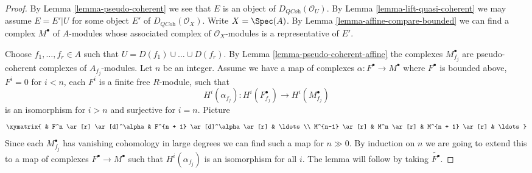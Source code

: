 \begin{proof}
By Lemma \ref{lemma-pseudo-coherent} we see that $E$ is an object of
$D_{\textit{QCoh}}(\mathcal{O}_U)$. By
Lemma \ref{lemma-lift-quasi-coherent}
we may assume $E = E'|U$ for some object $E'$ of
$D_{\textit{QCoh}}(\mathcal{O}_X)$.
Write $X = \Spec(A)$. By Lemma \ref{lemma-affine-compare-bounded}
we can find a complex $M^\bullet$ of $A$-modules whose associated
complex of $\mathcal{O}_X$-modules is a representative of $E'$.

\medskip\noindent
Choose $f_1, \ldots, f_r \in A$ such that $U = D(f_1) \cup \ldots \cup D(f_r)$.
By Lemma \ref{lemma-pseudo-coherent-affine} the complexes
$M^\bullet_{f_j}$ are pseudo-coherent complexes of $A_{f_j}$-modules.
Let $n$ be an integer. Assume we have a map of complexes
$\alpha : F^\bullet \to M^\bullet$ where $F^\bullet$ is
bounded above, $F^i = 0$ for $i < n$, each $F^i$ is a finite free
$R$-module, such that
$$
H^i(\alpha_{f_j}) : H^i(F^\bullet_{f_j}) \to H^i(M^\bullet_{f_j})
$$
is an isomorphism for $i > n$ and surjective for $i = n$. Picture
$$
\xymatrix{
& F^n \ar[r] \ar[d]^\alpha & F^{n + 1} \ar[d]^\alpha \ar[r] & \ldots \\
M^{n-1} \ar[r] & M^n \ar[r] & M^{n + 1} \ar[r] & \ldots
}
$$
Since each $M^\bullet_{f_j}$ has vanishing cohomology
in large degrees we can find such a map for $n \gg 0$.
By induction on $n$ we are going to extend this to a map
of complexes $F^\bullet \to M^\bullet$
such that $H^i(\alpha_{f_j})$ is an isomorphism
for all $i$. The lemma will follow by taking $\widetilde{F^\bullet}$.


\end{proof}
